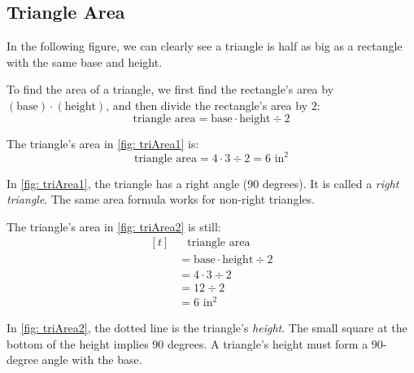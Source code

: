 \subsection{Triangle Area}
In the following figure, we can clearly see a triangle is half as big as a rectangle with the same base and height.

\pagebreak
\begin{center}
\label{fig: triArea1}
\end{center}

To find the area of a triangle, we first find the rectangle's area by $(\text{base})\cdot(\text{height})$, and then divide the rectangle's area by $2$:
\[ \text{triangle area}=\text{base} \cdot \text{height} \div2 \]

The triangle's area in \cref{fig: triArea1} is:
\[ \text{triangle area}=4\cdot3\div2 = 6 \text{ in}^{2} \]

In \cref{fig: triArea1}, the triangle has a right angle ($90$ degrees). It is called a \textit{right triangle}. The same area formula works for non-right triangles.

\begin{center}
\label{fig: triArea2}
\end{center}

The triangle's area in \cref{fig: triArea2} is still:
\[ 
\begin{aligned}[t]
	&\phantom{{}=}\text{triangle area} \\
	&= \text{base} \cdot \text{height} \div2 \\
	&=4\cdot3\div2 \\
	&=12\div2 \\
	&=6 \text{ in}^{2} 
\end{aligned}
\]

In \cref{fig: triArea2}, the dotted line is the triangle's \textit{height}. The small square at the bottom of the height implies $90$ degrees. A triangle's height must form a $90$-degree angle with the base.

